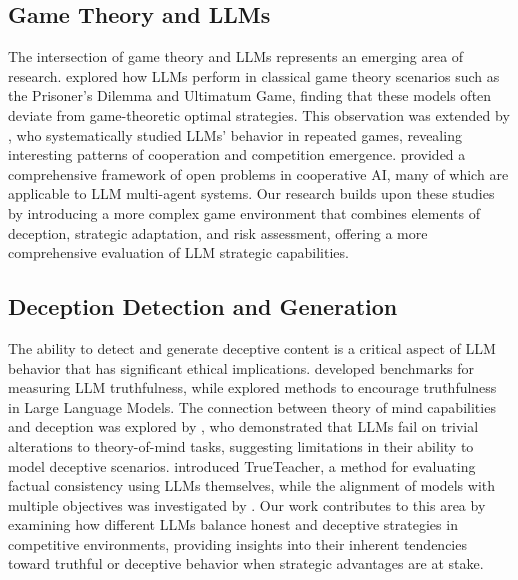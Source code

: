 \documentclass{article}
\begin{document}
\subsection{Game Theory and LLMs}
The intersection of game theory and LLMs represents an emerging area of research. \cite{xu2023exploring} explored how LLMs perform in classical game theory scenarios such as the Prisoner's Dilemma and Ultimatum Game, finding that these models often deviate from game-theoretic optimal strategies. This observation was extended by \cite{akata2023playing}, who systematically studied LLMs' behavior in repeated games, revealing interesting patterns of cooperation and competition emergence. \cite{dafoe2020open} provided a comprehensive framework of open problems in cooperative AI, many of which are applicable to LLM multi-agent systems. Our research builds upon these studies by introducing a more complex game environment that combines elements of deception, strategic adaptation, and risk assessment, offering a more comprehensive evaluation of LLM strategic capabilities.

\subsection{Deception Detection and Generation}
The ability to detect and generate deceptive content is a critical aspect of LLM behavior that has significant ethical implications. \cite{lin2022truthfulqa} developed benchmarks for measuring LLM truthfulness, while \cite{evans2021truthful} explored methods to encourage truthfulness in Large Language Models. The connection between theory of mind capabilities and deception was explored by \cite{ullman2023large}, who demonstrated that LLMs fail on trivial alterations to theory-of-mind tasks, suggesting limitations in their ability to model deceptive scenarios. \cite{gekhman2023trueteacher} introduced TrueTeacher, a method for evaluating factual consistency using LLMs themselves, while the alignment of models with multiple objectives was investigated by \cite{yang2024rewards}. Our work contributes to this area by examining how different LLMs balance honest and deceptive strategies in competitive environments, providing insights into their inherent tendencies toward truthful or deceptive behavior when strategic advantages are at stake.
\end{document}
